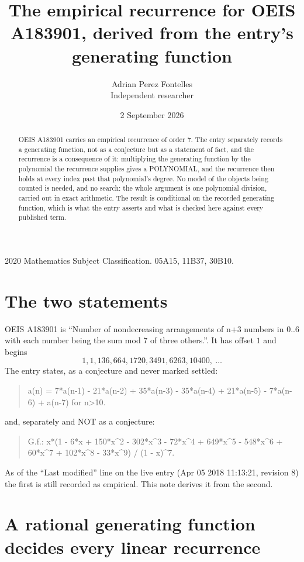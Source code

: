\documentclass[11pt,a4paper]{article}
\title{The empirical recurrence for OEIS A183901, derived from the entry's generating function}
\author{Adrian Perez Fontelles\\ \small Independent researcher}
\date{2 September 2026}
\theoremstyle{plain}
\theoremstyle{definition}
\begin{document}
\maketitle

\begin{abstract}
OEIS A183901 carries an empirical recurrence of order $7$. The entry separately records a
generating function, not as a conjecture but as a statement of fact, and the recurrence is a
consequence of it: multiplying the generating function by the polynomial the recurrence
supplies gives a POLYNOMIAL, and the recurrence then holds at every index past that
polynomial's degree. No model of the objects being counted is needed, and no search: the
whole argument is one polynomial division, carried out in exact arithmetic. The result is
conditional on the recorded generating function, which is what the entry asserts and what is
checked here against every published term.
\end{abstract}

\noindent\small 2020 Mathematics Subject Classification. 05A15, 11B37, 30B10.\normalsize

\section{The two statements}

OEIS A183901 is ``Number of nondecreasing arrangements of n+3 numbers in 0..6 with each number being the sum mod 7 of three others.''. It has offset $1$ and begins
\[
1, 1, 136, 664, 1720, 3491, 6263, 10400,\ \dots
\]
The entry states, as a conjecture and never marked settled:
\begin{quote}
a(n) = 7*a(n-1) - 21*a(n-2) + 35*a(n-3) - 35*a(n-4) + 21*a(n-5) - 7*a(n-6) + a(n-7) for n>10.
\end{quote}
and, separately and NOT as a conjecture:
\begin{quote}
G.f.: x*(1 - 6*x + 150*x\^{}2 - 302*x\^{}3 - 72*x\^{}4 + 649*x\^{}5 - 548*x\^{}6 + 60*x\^{}7 + 102*x\^{}8 - 33*x\^{}9) / (1 - x)\^{}7.
\end{quote}
As of the ``Last modified'' line on the live entry (Apr 05 2018 11:13:21, revision 8) the first is still
recorded as empirical. This note derives it from the second.

\section{A rational generating function decides every linear recurrence}
\end{document}
